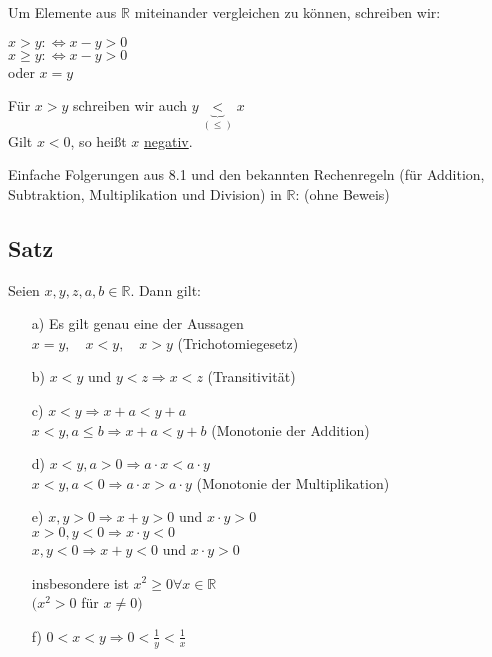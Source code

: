 \documentclass[a4paper, 12pt, twoside] {article}
\begin{document}
Um Elemente aus $\mathbb{R}$ miteinander vergleichen zu können, schreiben wir:

$x > y: \Leftrightarrow x - y > 0$ \\
$x \geq y: \Leftrightarrow x - y > 0$ \\
oder $x = y$

Für $x > y$ schreiben wir auch $y \underbrace{<}_{(\leq)} x$ \\
Gilt $x < 0$, so heißt $x$ \underline{negativ}.

Einfache Folgerungen aus 8.1 und den bekannten Rechenregeln (für Addition, Subtraktion, Multiplikation und Division) in $\mathbb{R}$: (ohne Beweis)

\subsection{Satz} %
Seien $x, y, z, a, b \in \mathbb{R}$. Dann gilt:

\begin{itemize}

\item[a)] Es gilt genau eine der Aussagen \\
$x = y, \quad x < y, \quad x > y$ (Trichotomiegesetz)

\item[b)] $x < y$ und $y < z \Rightarrow x < z$ (Transitivität)

\item[c)] $x < y \Rightarrow x + a < y + a$ \\
$x < y, a \leq b \Rightarrow x + a < y + b$ (Monotonie der Addition)

\item[d)] $x < y, a > 0 \Rightarrow a \cdot x < a \cdot y$ \\
$x < y, a < 0 \Rightarrow a \cdot x > a \cdot y$ (Monotonie der Multiplikation)

\item[e)] $x, y > 0 \Rightarrow x + y > 0$ und $x \cdot y > 0$ \\
$x > 0, y < 0 \Rightarrow x \cdot y < 0$ \\
$x, y < 0 \Rightarrow x + y < 0$ und $x \cdot y > 0$

insbesondere ist $x^2 \geq 0 \forall x \in \mathbb{R}$ \\
$(x^2 > 0$ für $x \neq 0)$

\item[f)] $0 < x < y \Rightarrow 0 < \frac{1}{y} < \frac{1}{x}$

\end{itemize}
\end{document}

